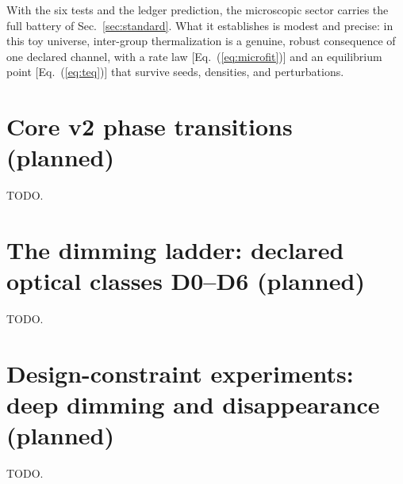 \documentclass[aps,reprint,amsmath,amssymb,nofootinbib,superscriptaddress,floatfix]{revtex4-2}
\begin{document}
With the six tests and the ledger prediction, the microscopic sector
carries the full battery of Sec.~\ref{sec:standard}. What it
establishes is modest and precise: in this toy universe, inter-group
thermalization is a genuine, robust consequence of one declared channel,
with a rate law [Eq.~(\ref{eq:microfit})] and an equilibrium point
[Eq.~(\ref{eq:teq})] that survive seeds, densities, and perturbations.

\section{Core v2 phase transitions (planned)}
\label{sec:corev2}
TODO.

\section{The dimming ladder: declared optical classes D0--D6 (planned)}
\label{sec:dimming}
TODO.

\section{Design-constraint experiments: deep dimming and disappearance (planned)}
\label{sec:constraints}
TODO.
\end{document}
